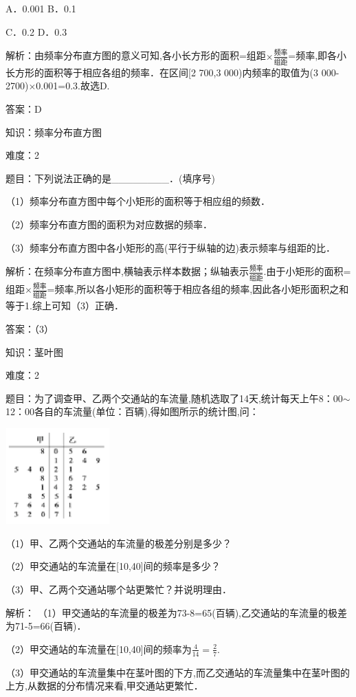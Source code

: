 \documentclass{article} %
\begin{document}
A．0.001  B．0.1

C．0.2    D．0.3

解析：由频率分布直方图的意义可知,各小长方形的面积=组距$\mathrm{\times}\frac{\text{频率}}{组距}$=频率,即各小长方形的面积等于相应各组的频率．在区间[2 700,3 000)内频率的取值为(3 000-2700)$\mathrm{\times}$0.001=0.3.故选D.

答案：D

知识：频率分布直方图

难度：2

题目：下列说法正确的是\_\_\_\_\_\_\_\_．(填序号)

（1）频率分布直方图中每个小矩形的面积等于相应组的频数．

（2）频率分布直方图的面积为对应数据的频率．

（3）频率分布直方图中各小矩形的高(平行于纵轴的边)表示频率与组距的比．

解析：在频率分布直方图中,横轴表示样本数据；纵轴表示$\frac{\text{频率}}{\text{组距}}$.由于小矩形的面积=组距$\mathrm{\times}\frac{\text{频率}}{\text{组距}}$=频率,所以各小矩形的面积等于相应各组的频率,因此各小矩形面积之和等于1.综上可知（3）正确．

答案：（3）

知识：茎叶图

难度：2

题目：为了调查甲、乙两个交通站的车流量,随机选取了14天,统计每天上午8：00$\sim$12：00各自的车流量(单位：百辆),得如图所示的统计图,问：

\includegraphics*[width=1.59in, height=1.45in, keepaspectratio=false]{image90}

（1）甲、乙两个交通站的车流量的极差分别是多少？

（2）甲交通站的车流量在[10,40]间的频率是多少？

（3）甲、乙两个交通站哪个站更繁忙？并说明理由．

解析：  （1）甲交通站的车流量的极差为73-8=65(百辆),乙交通站的车流量的极差为71-5=66(百辆)．

（2）甲交通站的车流量在[10,40]间的频率为$\frac{4}{14}=\frac{2}{7}$.

（3）甲交通站的车流量集中在茎叶图的下方,而乙交通站的车流量集中在茎叶图的上方,从数据的分布情况来看,甲交通站更繁忙．
\end{document}
